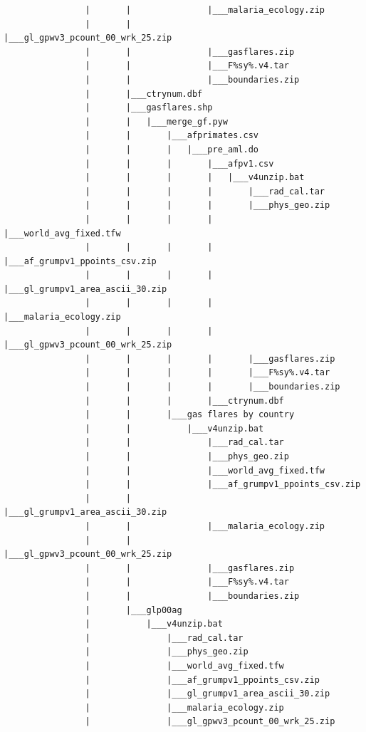 \documentclass[]{book}
\begin{document}
\begin{verbatim}
                |       |               |___malaria_ecology.zip
                |       |               |___gl_gpwv3_pcount_00_wrk_25.zip
                |       |               |___gasflares.zip
                |       |               |___F%sy%.v4.tar
                |       |               |___boundaries.zip
                |       |___ctrynum.dbf
                |       |___gasflares.shp
                |       |   |___merge_gf.pyw
                |       |       |___afprimates.csv
                |       |       |   |___pre_aml.do
                |       |       |       |___afpv1.csv
                |       |       |       |   |___v4unzip.bat
                |       |       |       |       |___rad_cal.tar
                |       |       |       |       |___phys_geo.zip
                |       |       |       |       |___world_avg_fixed.tfw
                |       |       |       |       |___af_grumpv1_ppoints_csv.zip
                |       |       |       |       |___gl_grumpv1_area_ascii_30.zip
                |       |       |       |       |___malaria_ecology.zip
                |       |       |       |       |___gl_gpwv3_pcount_00_wrk_25.zip
                |       |       |       |       |___gasflares.zip
                |       |       |       |       |___F%sy%.v4.tar
                |       |       |       |       |___boundaries.zip
                |       |       |       |___ctrynum.dbf
                |       |       |___gas flares by country
                |       |           |___v4unzip.bat
                |       |               |___rad_cal.tar
                |       |               |___phys_geo.zip
                |       |               |___world_avg_fixed.tfw
                |       |               |___af_grumpv1_ppoints_csv.zip
                |       |               |___gl_grumpv1_area_ascii_30.zip
                |       |               |___malaria_ecology.zip
                |       |               |___gl_gpwv3_pcount_00_wrk_25.zip
                |       |               |___gasflares.zip
                |       |               |___F%sy%.v4.tar
                |       |               |___boundaries.zip
                |       |___glp00ag
                |           |___v4unzip.bat
                |               |___rad_cal.tar
                |               |___phys_geo.zip
                |               |___world_avg_fixed.tfw
                |               |___af_grumpv1_ppoints_csv.zip
                |               |___gl_grumpv1_area_ascii_30.zip
                |               |___malaria_ecology.zip
                |               |___gl_gpwv3_pcount_00_wrk_25.zip

\end{verbatim}
\end{document}
